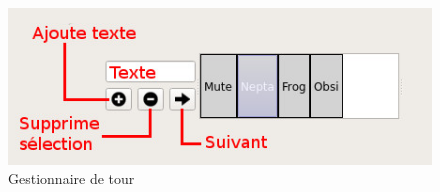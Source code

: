 \begin{figure}[h!]
	\centering
	\includegraphics[scale=0.7]{img/turn_manager.jpg}
	\caption{Gestionnaire de tour}
\end{figure}
